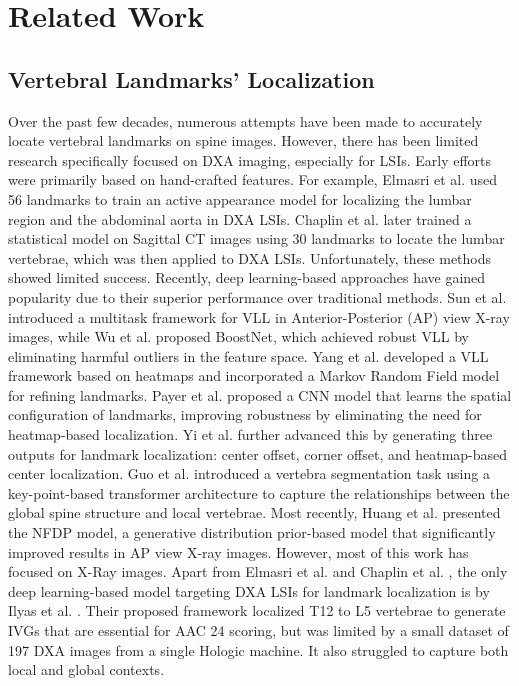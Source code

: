 \section{Related Work}
\subsection{Vertebral Landmarks' Localization}
Over the past few decades, numerous attempts have been made to accurately locate vertebral landmarks on spine images. However, there has been limited research specifically focused on DXA imaging, especially for LSIs. Early efforts were primarily based on hand-crafted features. For example, Elmasri et al. \cite{k_elmasri} used 56 landmarks to train an active appearance model for localizing the lumbar region and the abdominal aorta in DXA LSIs. Chaplin et al. \cite{t_cootes} later trained a statistical model on Sagittal CT images using 30 landmarks to locate the lumbar vertebrae, which was then applied to DXA LSIs. Unfortunately, these methods showed limited success. Recently, deep learning-based approaches have gained popularity due to their superior performance over traditional methods. Sun et al. \cite{sun} introduced a multitask framework for VLL in Anterior-Posterior (AP) view X-ray images, while Wu et al. \cite{wu} proposed BoostNet, which achieved robust VLL by eliminating harmful outliers in the feature space. Yang et al. \cite{yang} developed a VLL framework based on heatmaps and incorporated a Markov Random Field model for refining landmarks. Payer et al. \cite{payer} proposed a CNN model that learns the spatial configuration of landmarks, improving robustness by eliminating the need for heatmap-based localization. Yi et al. \cite{yi} further advanced this by generating three outputs for landmark localization: center offset, corner offset, and heatmap-based center localization. Guo et al. \cite{guo} introduced a vertebra segmentation task using a key-point-based transformer architecture to capture the relationships between the global spine structure and local vertebrae. Most recently, Huang et al. \cite{zixun} presented the NFDP model, a generative distribution prior-based model that significantly improved results in AP view X-ray images. However, most of this work has focused on X-Ray images. Apart from Elmasri et al. \cite{k_elmasri} and Chaplin et al. \cite{t_cootes}, the only deep learning-based model targeting DXA LSIs for landmark localization is by Ilyas et al. \cite{zaid}. Their proposed framework localized T12 to L5 vertebrae to generate IVGs that are essential for AAC 24 scoring, but was limited by a small dataset of 197 DXA images from a single Hologic machine. It also struggled to capture both local and global contexts. \par

